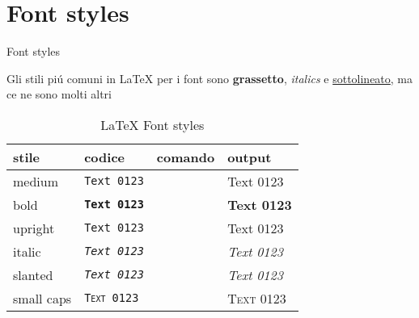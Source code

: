 \section{Font styles}

\begin{frame}{Font styles}
    
    Gli stili piú comuni in \LaTeX{} per i font sono \textbf{grassetto}, \textit{italics} e \underline{sottolineato}, ma ce ne sono molti altri
    
    \begin{table}[]
        \centering
        \footnotesize
        \begin{tabular}{ l l l l }
            \textbf{stile} & \textbf{codice} & \textbf{comando} & \textbf{output}\\
            \hline
             medium &  \texttt{\textmd{Text 0123}} &  \texttt{\mdseries} & \textmd{Text 0123} \\
             		
             bold &  \texttt{\textbf{Text 0123}} &  \texttt{\bfseries} & \textbf{Text 0123} \\
             
             upright &  \texttt{\textup{Text 0123}} &  \texttt{\upshape} & \textup{Text 0123} \\
             
             italic &  \texttt{\textit{Text 0123}} &  \texttt{\itshape} & \textit{Text 0123} \\
             
             slanted &  \texttt{\textsl{Text 0123}} &  \texttt{\slshape} & \textsl{Text 0123} \\
             
             small caps &  \texttt{\textsc{Text 0123}} &  \texttt{\scshape} & \textsc{Text 0123} \\
        \end{tabular}
        \footnotesize
        \vspace{5mm}
        \caption{\LaTeX{} Font styles}
        \label{tab:font_styles}
    \end{table}
    

\end{frame} 